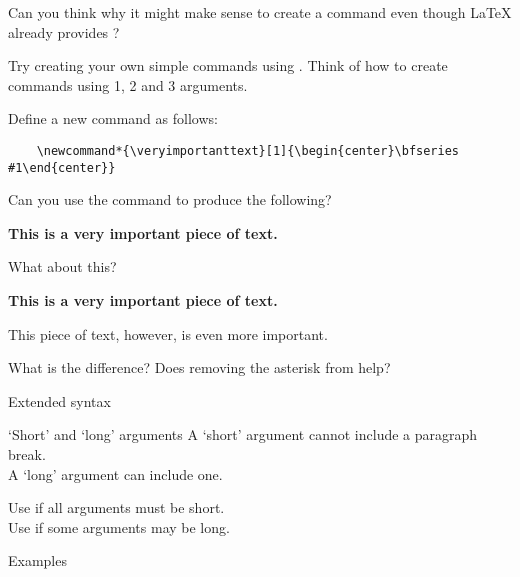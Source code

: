 \begin{exercise}
  Can you think why it might make sense to create a command  even though \LaTeX{} already provides ?

  Try creating your own simple commands using .
  Think of how to create commands using 1, 2 and 3 arguments.

  Define a new command as follows:
  \begin{verbatim}
	\newcommand*{\veryimportanttext}[1]{\begin{center}\bfseries #1\end{center}}
  \end{verbatim}

  Can you use the command to produce the following?
  \begin{center}
	\bfseries This is a very important piece of text.
  \end{center}
  What about this?
  \begin{center}
  	\bfseries This is a very important piece of text.

	This piece of text, however, is even more important.
  \end{center}
  What is the difference?
  Does removing the asterisk from  help?
\end{exercise}


\begin{frame}{Extended syntax}

  \begin{block}{‘Short’ and ‘long’ arguments}
  	A ‘short’ argument cannot include a paragraph break.\\
	A ‘long’ argument can include one.

    Use \alert<2>{} if all arguments must be \alert<2>{short}.\\
    Use \alert<3>{} if some arguments may be \alert<3>{long}.
  \end{block}

  \begin{block}{Examples}
	\newline
  \end{block}

\end{frame}

